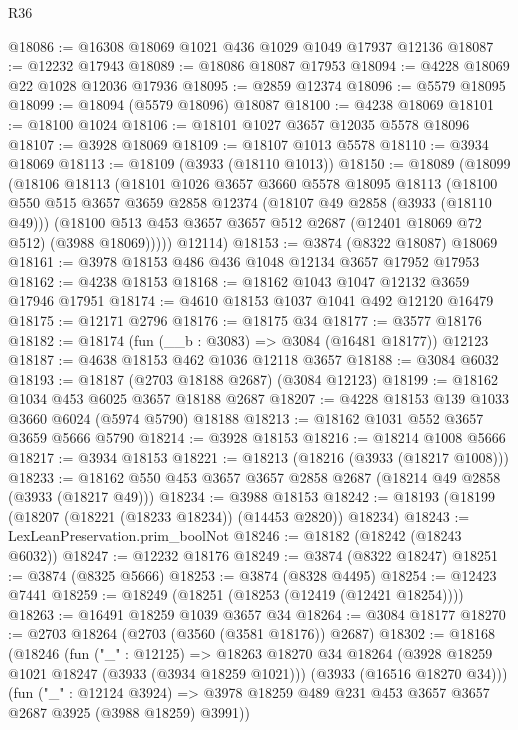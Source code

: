 \begin{lexlean}{R36}
\begin{coremodule}
@18086 := @16308 @18069 @1021 @436 @1029 @1049 @17937 @12136
@18087 := @12232 @17943
@18089 := @18086 @18087 @17953
@18094 := @4228 @18069 @22 @1028 @12036 @17936
@18095 := @2859 @12374
@18096 := @5579 @18095
@18099 := @18094 (@5579 @18096) @18087
@18100 := @4238 @18069
@18101 := @18100 @1024
@18106 := @18101 @1027 @3657 @12035 @5578 @18096
@18107 := @3928 @18069
@18109 := @18107 @1013 @5578
@18110 := @3934 @18069
@18113 := @18109 (@3933 (@18110 @1013))
@18150 := @18089
    (@18099
      (@18106
        @18113
        (@18101
          @1026
          @3657
          @3660
          @5578
          @18095
          @18113
          (@18100
            @550
            @515
            @3657
            @3659
            @2858
            @12374
            (@18107 @49 @2858 (@3933 (@18110 @49)))
            (@18100 @513 @453 @3657 @3657 @512 @2687 (@12401 @18069 @72 @512) (@3988 @18069)))))
      @12114)
@18153 := @3874 (@8322 @18087) @18069
@18161 := @3978 @18153 @486 @436 @1048 @12134 @3657 @17952 @17953
@18162 := @4238 @18153
@18168 := @18162 @1043 @1047 @12132 @3659 @17946 @17951
@18174 := @4610 @18153 @1037 @1041 @492 @12120 @16479
@18175 := @12171 @2796
@18176 := @18175 @34
@18177 := @3577 @18176
@18182 := @18174 (fun (__b : @3083) => @3084 (@16481 @18177)) @12123
@18187 := @4638 @18153 @462 @1036 @12118 @3657
@18188 := @3084 @6032
@18193 := @18187 (@2703 @18188 @2687) (@3084 @12123)
@18199 := @18162 @1034 @453 @6025 @3657 @18188 @2687
@18207 := @4228 @18153 @139 @1033 @3660 @6024 (@5974 @5790) @18188
@18213 := @18162 @1031 @552 @3657 @3659 @5666 @5790
@18214 := @3928 @18153
@18216 := @18214 @1008 @5666
@18217 := @3934 @18153
@18221 := @18213 (@18216 (@3933 (@18217 @1008)))
@18233 := @18162 @550 @453 @3657 @3657 @2858 @2687 (@18214 @49 @2858 (@3933 (@18217 @49)))
@18234 := @3988 @18153
@18242 := @18193 (@18199 (@18207 (@18221 (@18233 @18234)) (@14453 @2820)) @18234)
@18243 := LexLeanPreservation.prim_boolNot
@18246 := @18182 (@18242 (@18243 @6032))
@18247 := @12232 @18176
@18249 := @3874 (@8322 @18247)
@18251 := @3874 (@8325 @5666)
@18253 := @3874 (@8328 @4495)
@18254 := @12423 @7441
@18259 := @18249 (@18251 (@18253 (@12419 (@12421 @18254))))
@18263 := @16491 @18259 @1039 @3657 @34
@18264 := @3084 @18177
@18270 := @2703 @18264 (@2703 (@3560 (@3581 @18176)) @2687)
@18302 := @18168
    (@18246
      (fun ("_" : @12125) =>
      @18263
        @18270
        @34
        @18264
        (@3928 @18259 @1021 @18247 (@3933 (@3934 @18259 @1021)))
        (@3933 (@16516 @18270 @34)))
      (fun ("_" : @12124 @3924) =>
      @3978 @18259 @489 @231 @453 @3657 @3657 @2687 @3925 (@3988 @18259) @3991))

\end{coremodule}
\end{lexlean}
